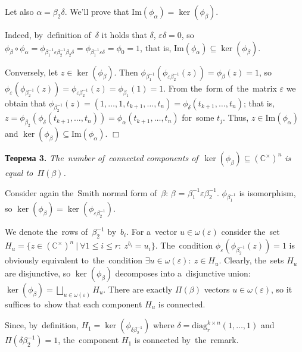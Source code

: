 \documentclass[twoside]{article}
\begin{document}
    Let also $\alpha = \beta_2 \delta$. We'll prove that $\mathrm{Im}(\phi_\alpha) = \ker(\phi_\beta)$.

    Indeed, by~definition of~$\delta$ it holds that $\delta$, $\varepsilon \delta = 0$, so $\phi_{\beta} \circ \phi_{\alpha} = \phi_{\beta_1^{-1} \varepsilon \beta_2^{-1} \beta_2 \delta} = \phi_{\beta_1^{-1} \varepsilon \delta} = \phi_{0} = 1$,
    that is, $\mathrm{Im}(\phi_{\alpha}) \subseteq \ker(\phi_{\beta})$.

    Conversely, let $z \in \ker(\phi_\beta)$. Then $\phi_{\beta_1^{-1}} (\phi_{\varepsilon \beta_2^{-1}}(z)) = \phi_\beta(z) = 1$,
    so $\phi_{\varepsilon}(\phi_{\beta_2^{-1}}(z)) = \phi_{\varepsilon \beta_2^{-1}}(z) = \phi_{\beta_1}(1) = 1$.
    From the~form of~the~matrix $\varepsilon$ we obtain that
    $
        \phi_{\beta_2^{-1}}(z) = (1,\allowbreak \ldots,\allowbreak 1,\allowbreak t_{k + 1},\allowbreak \ldots, t_n) = \phi_\delta(t_{k + 1}, \ldots, t_n)
    $; that is, $z = \phi_{\beta_2}(\phi_\delta(t_{k + 1}, \ldots, t_n)) = \phi_\alpha(t_{k + 1}, \ldots, t_n)$ for~some $t_j$.
    Thus, $z \in \mathrm{Im}(\phi_\alpha)$ and $\ker(\phi_\beta) \subseteq \mathrm{Im}(\phi_\alpha)$.
\hfill$\Box$\medskip

\medskip\noindent\textbf{Теорема 3.}\emph{
    The~number of~connected components of~$\ker(\phi_\beta) \subseteq ({\mathbb{C}^\times})^n$ is equal to~$\Pi(\beta)$.
}\medskip

    Consider again the~Smith normal form of~$\beta$: $\beta$ = $\beta_1^{-1} \varepsilon \beta_2^{-1}$.
    $\phi_{\beta_1^{-1}}$ is isomorphism, so $\ker(\phi_{\beta}) = \ker(\phi_{\varepsilon \beta_2^{-1}})$.

    We denote the~rows of~$\beta_2^{-1}$ by~$b_i$. For a~vector $u \in \omega(\varepsilon)$ consider
    the~set $H_u = \{z \in ({\mathbb{C}^\times})^n \ | \ \forall 1 \leq i \leq r{:}\ z^{b_i} = u_i\}$.
    The~condition $\phi_\varepsilon(\phi_{\beta_2^{-1}}(z)) = 1$ is obviously equivalent to~the~condition
    $\exists u \in \omega(\varepsilon){:}\ z \in H_u$. Clearly, the~sets $H_u$ are disjunctive,
    so $\ker(\phi_{\beta})$ decomposes into a~disjunctive union:
    $
        \ker(\phi_{\beta}) = \bigsqcup_{u \in \omega(\varepsilon)} H_u.
    $
    There are exactly $\Pi(\beta)$ vectors $u \in \omega(\varepsilon)$, so it suffices to~show that
    each component $H_u$ is connected.

    Since, by~definition, $H_1 = \ker(\phi_{\delta \beta_2^{-1}})$ where $\delta = \mathrm{diag}^{k \times n}_r(1, \ldots, 1)$
    and $\Pi(\delta \beta_2^{-1}) = 1$, the~component $H_1$ is connected by~the~remark.
\end{document}
